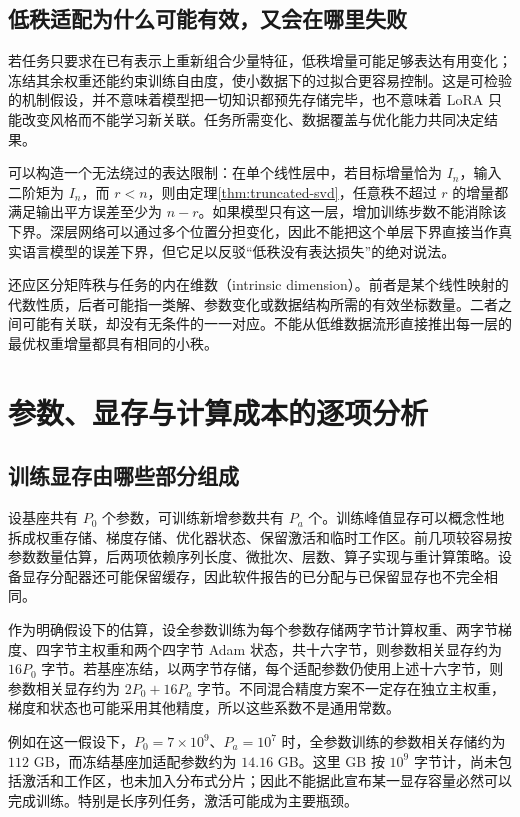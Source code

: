 \documentclass[UTF8,12pt,a4paper,fontset=fandol]{ctexart}
\begin{document}
\subsection{低秩适配为什么可能有效，又会在哪里失败}

若任务只要求在已有表示上重新组合少量特征，低秩增量可能足够表达有用变化；冻结其余权重还能约束训练自由度，使小数据下的过拟合更容易控制。这是可检验的机制假设，并不意味着模型把一切知识都预先存储完毕，也不意味着 LoRA 只能改变风格而不能学习新关联。任务所需变化、数据覆盖与优化能力共同决定结果。

可以构造一个无法绕过的表达限制：在单个线性层中，若目标增量恰为 $I_n$，输入二阶矩为 $I_n$，而 $r<n$，则由定理\ref{thm:truncated-svd}，任意秩不超过 $r$ 的增量都满足输出平方误差至少为 $n-r$。如果模型只有这一层，增加训练步数不能消除该下界。深层网络可以通过多个位置分担变化，因此不能把这个单层下界直接当作真实语言模型的误差下界，但它足以反驳“低秩没有表达损失”的绝对说法。

还应区分矩阵秩与任务的内在维数（intrinsic dimension）。前者是某个线性映射的代数性质，后者可能指一类解、参数变化或数据结构所需的有效坐标数量。二者之间可能有关联，却没有无条件的一一对应。不能从低维数据流形直接推出每一层的最优权重增量都具有相同的小秩。

\section{参数、显存与计算成本的逐项分析}
\label{sec:resources}

\subsection{训练显存由哪些部分组成}

设基座共有 $P_0$ 个参数，可训练新增参数共有 $P_a$ 个。训练峰值显存可以概念性地拆成权重存储、梯度存储、优化器状态、保留激活和临时工作区。前几项较容易按参数数量估算，后两项依赖序列长度、微批次、层数、算子实现与重计算策略。设备显存分配器还可能保留缓存，因此软件报告的已分配与已保留显存也不完全相同。

作为明确假设下的估算，设全参数训练为每个参数存储两字节计算权重、两字节梯度、四字节主权重和两个四字节 Adam 状态，共十六字节，则参数相关显存约为 $16P_0$ 字节。若基座冻结，以两字节存储，每个适配参数仍使用上述十六字节，则参数相关显存约为
$2P_0+16P_a$ 字节。不同混合精度方案不一定存在独立主权重，梯度和状态也可能采用其他精度，所以这些系数不是通用常数。

例如在这一假设下，$P_0=7\times10^9$、$P_a=10^7$ 时，全参数训练的参数相关存储约为 $112$ GB，而冻结基座加适配参数约为 $14.16$ GB。这里 GB 按 $10^9$ 字节计，尚未包括激活和工作区，也未加入分布式分片；因此不能据此宣布某一显存容量必然可以完成训练。特别是长序列任务，激活可能成为主要瓶颈。
\end{document}
